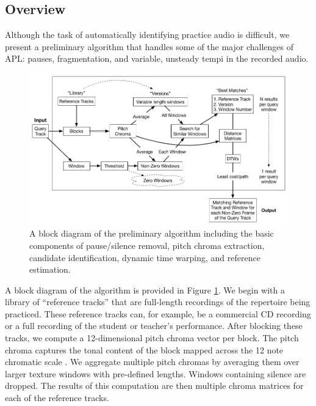 \documentclass{article}
\begin{document}

\subsection{Overview}
\label{sec:Overview}
Although the task of automatically identifying practice audio is difficult, we present a preliminary algorithm that handles some of the major challenges of APL: pauses, fragmentation, and variable, unsteady tempi in the recorded audio.

\begin{figure}
\includegraphics[width=\linewidth]{figs/APLSystem2.jpg}
\caption{A block diagram of the preliminary algorithm including the basic components of pause/silence removal, pitch chroma extraction, candidate identification, dynamic time warping, and reference estimation.}
\label{fig:APLSystem}
\end{figure}%


A block diagram of the algorithm is provided in Figure \ref{fig:APLSystem}. We begin with a library of ``reference tracks'' that are full-length recordings of the repertoire being practiced. These reference tracks can, for example, be a commercial CD recording or a full recording of the student or teacher's performance. After blocking these tracks, we compute a 12-dimensional pitch chroma vector per block. The pitch chroma captures the tonal content of the block mapped across the 12 note chromatic scale \cite{bartsch2001catch}. We aggregate multiple pitch chromas by averaging them over larger texture windows with pre-defined lengths. Windows containing silence are dropped. The results of this computation are then multiple chroma matrices for each of the reference tracks.
\end{document}
